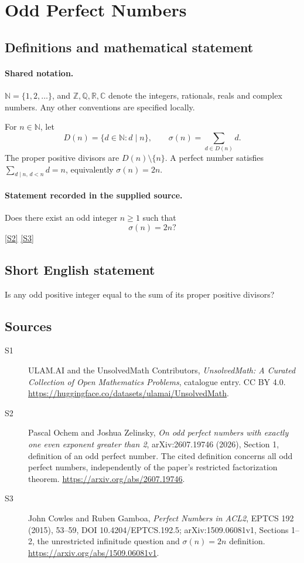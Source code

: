 \documentclass[11pt]{article}
\newcommand{\sref}[2]{\hyperlink{source:#1:#2}{[S#2]}}
\begin{document}
\section{Odd Perfect Numbers}\label{statement}

\subsection{Definitions and mathematical statement}

\paragraph{Shared notation.}$\mathbb N=\{1,2,\ldots\}$, and $\mathbb Z,\mathbb Q,\mathbb R,\mathbb C$ denote the integers, rationals, reals and complex numbers. Any other conventions are specified locally.


For \(n\in\mathbb N\), let
\[
 D(n)=\{d\in\mathbb N:d\mid n\},\qquad
 \sigma(n)=\sum_{d\in D(n)}d.
\]
The proper positive divisors are \(D(n)\setminus\{n\}\).
A perfect number satisfies \(\sum_{d\mid n,\,d<n}d=n\), equivalently
\(\sigma(n)=2n\).
\paragraph{Statement recorded in the supplied source.}
Does there exist an odd integer \(n\ge1\) such that
\[
                            \sigma(n)=2n?
\] \sref{statement}{2} \sref{statement}{3}
\subsection{Short English statement}
Is any odd positive integer equal to the sum of its proper positive divisors?
\subsection{Sources}
\begin{description}
\item[\hypertarget{source:statement:1}{S1}] ULAM.AI and the UnsolvedMath Contributors, \emph{UnsolvedMath: A Curated Collection of Open Mathematics Problems}, catalogue entry. CC BY 4.0. \url{https://huggingface.co/datasets/ulamai/UnsolvedMath}.
\item[\hypertarget{source:statement:2}{S2}] Pascal Ochem and Joshua Zelinsky, \emph{On odd perfect numbers with exactly one even exponent greater than 2}, arXiv:2607.19746 (2026), Section 1, definition of an odd perfect number. The cited definition concerns all odd perfect numbers, independently of the paper's restricted factorization theorem. \url{https://arxiv.org/abs/2607.19746}.
\item[\hypertarget{source:statement:3}{S3}] John Cowles and Ruben Gamboa, \emph{Perfect Numbers in ACL2}, EPTCS 192 (2015), 53--59, DOI 10.4204/EPTCS.192.5; arXiv:1509.06081v1, Sections 1--2, the unrestricted infinitude question and $\sigma(n)=2n$ definition. \url{https://arxiv.org/abs/1509.06081v1}.
\end{description}
\label{end:statement}
\end{document}
